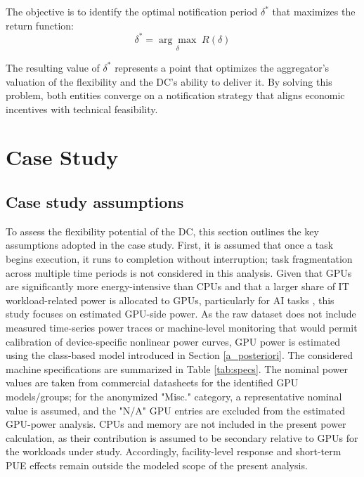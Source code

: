 \documentclass[preprint,12pt]{elsarticle}
\begin{document}
The objective is to identify the optimal notification period \( \delta^* \) that maximizes the return function:
\begin{equation}
    \delta^* = \underset{\delta}{\arg\max} \; R(\delta)
\end{equation}

The resulting value of \( \delta^* \) represents a point that optimizes the aggregator’s valuation of the flexibility and the DC’s ability to deliver it. By solving this problem, both entities converge on a notification strategy that aligns economic incentives with technical feasibility.


\section{Case Study}\label{case study}
\subsection{Case study assumptions}
To assess the flexibility potential of the DC, this section outlines the key assumptions adopted in the case study. First, it is assumed that once a task begins execution, it runs to completion without interruption; task fragmentation across multiple time periods is not considered in this analysis. Given that GPUs are significantly more energy-intensive than CPUs and that a larger share of IT workload-related power is allocated to GPUs, particularly for AI tasks \cite{LLM}, this study focuses on estimated GPU-side power. As the raw dataset does not include measured time-series power traces or machine-level monitoring that would permit calibration of device-specific nonlinear power curves, GPU power is estimated using the class-based model introduced in Section \ref{a_posteriori}.
The considered machine specifications are summarized in Table \ref{tab:specs}. The nominal power values are taken from commercial datasheets for the identified GPU models/groups; for the anonymized "Misc." category, a representative nominal value is assumed, and the "N/A" GPU entries are excluded from the estimated GPU-power analysis. CPUs and memory are not included in the present power calculation, as their contribution is assumed to be secondary relative to GPUs for the workloads under study. Accordingly, facility-level response and short-term PUE effects remain outside the modeled scope of the present analysis.
\end{document}
